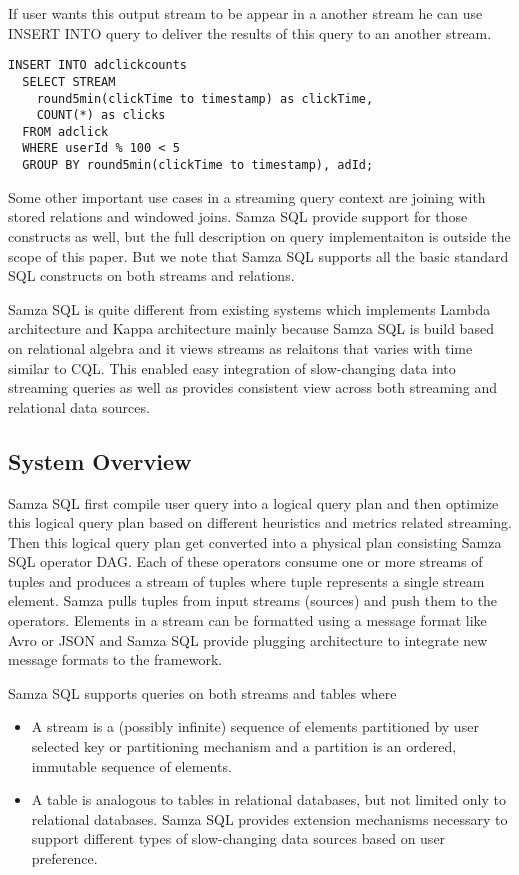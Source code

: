 \documentclass[10pt, conference, compsocconf]{IEEEtran}
\begin{document}
If user wants this output stream to be appear in a another stream he can use INSERT INTO query to deliver the results of this query to an another stream.

\begin{lstlisting}
INSERT INTO adclickcounts
  SELECT STREAM 
    round5min(clickTime to timestamp) as clickTime,
    COUNT(*) as clicks
  FROM adclick
  WHERE userId % 100 < 5
  GROUP BY round5min(clickTime to timestamp), adId;
\end{lstlisting}

Some other important use cases in a streaming query context are joining with stored relations and windowed joins. Samza SQL provide support for those constructs as well, but the full description on query implementaiton is outside the scope of this paper. But we note that Samza SQL supports all the basic standard SQL constructs on both streams and relations.

Samza SQL is quite different from existing systems which implements Lambda architecture and Kappa architecture mainly because Samza SQL is build based on relational algebra and it views streams as relaitons that varies with time similar to CQL. This enabled easy integration of slow-changing data into streaming queries as well as provides consistent view across both streaming and relational data sources.

\subsection{System Overview}

Samza SQL first compile user query into a logical query plan and then optimize this logical query plan based on different heuristics and metrics related streaming. Then this logical query plan get converted into a physical plan consisting Samza SQL operator DAG. Each of these operators consume one or more streams of tuples and produces a stream of tuples where tuple represents a single stream element. Samza pulls tuples from input streams (sources) and push them to the operators. Elements in a stream can be formatted using a message format like Avro or JSON and Samza SQL provide plugging architecture to integrate new message formats to the framework. 

Samza SQL supports queries on both streams and tables where

\begin{itemize}
  \item A stream is a (possibly infinite) sequence of elements partitioned by user selected key or partitioning mechanism and a partition is an ordered, immutable sequence of elements.
  \item A table is analogous to tables in relational databases, but not limited only to relational databases. Samza SQL provides extension mechanisms necessary to support different types of slow-changing data sources based on user preference.
\end{itemize}
\end{document}
